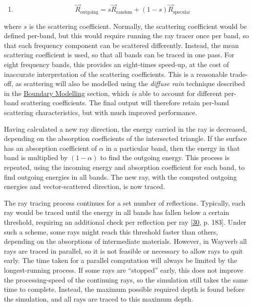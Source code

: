 \documentclass[]{scrreprt}
\providecommand{\tightlist}{%
  \setlength{\itemsep}{0pt}\setlength{\parskip}{0pt}}
\begin{document}
\begin{enumerate}
\def\labelenumi{(\arabic{enumi})}
\setcounter{enumi}{7}
\tightlist
\item
  \[\overrightarrow{R}_\text{outgoing}=s\overrightarrow{R}_\text{random} +
  (1-s)\overrightarrow{R}_\text{specular}\]
\end{enumerate}

where \(s\) is the scattering coefficient. Normally, the scattering
coefficient would be defined per-band, but this would require running
the ray tracer once per band, so that each frequency component can be
scattered differently. Instead, the mean scattering coefficient is used,
so that all bands can be traced in one pass. For eight frequency bands,
this provides an eight-times speed-up, at the cost of inaccurate
interpretation of the scattering coefficients. This is a reasonable
trade-off, as scattering will also be modelled using the \emph{diffuse
rain} technique described in the
\href{\%7B\%7B\%20site.baseurl\%20\%7D\%7D\%7B\%\%20link\%20boundary.md\%20\%\%7D}{Boundary
Modelling} section, which \emph{is} able to account for different
per-band scattering coefficients. The final output will therefore retain
per-band scattering characteristics, but with much improved performance.

Having calculated a new ray direction, the energy carried in the ray is
decreased, depending on the absorption coefficients of the intersected
triangle. If the surface has an absorption coefficient of \(\alpha\) in
a particular band, then the energy in that band is multiplied by
\((1 - \alpha)\) to find the outgoing energy. This process is repeated,
using the incoming energy and absorption coefficient for each band, to
find outgoing energies in all bands. The new ray, with the computed
outgoing energies and vector-scattered direction, is now traced.

The ray tracing process continues for a set number of reflections.
Typically, each ray would be traced until the energy in all bands has
fallen below a certain threshold, requiring an additional check per
reflection per ray
{[}\protect\hyperlink{ref-vorlanderux5fauralization:ux5f2007}{30}, p.
183{]}. Under such a scheme, some rays might reach this threshold faster
than others, depending on the absorptions of intermediate materials.
However, in Wayverb all rays are traced in parallel, so it is not
feasible or necessary to allow rays to quit early. The time taken for a
parallel computation will always be limited by the longest-running
process. If some rays are ``stopped'' early, this does not improve the
processing-speed of the continuing rays, so the simulation still takes
the same time to complete. Instead, the maximum possible required depth
is found before the simulation, and all rays are traced to this maximum
depth.
\end{document}

